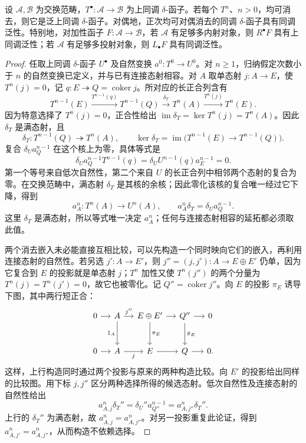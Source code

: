 \begin{theorem}[消去性与泛性]\label{b4:thm:derived-universal}
	设 \(\mathcal A,\mathcal B\) 为交换范畴，\(T^\bullet:\mathcal A\to\mathcal B\) 为上同调 \(\delta\)-函子。若每个 \(T^n\)、\(n>0\)，均可消去，则它是泛上同调 \(\delta\)-函子。对偶地，正次均可对偶消去的同调 \(\delta\)-函子具有同调泛性。特别地，对加性函子 \(F:\mathcal A\to\mathcal B\)，若 \(\mathcal A\) 有足够多内射对象，则 \(R^\bullet F\) 具有上同调泛性；若 \(\mathcal A\) 有足够多投射对象，则 \(L_\bullet F\) 具有同调泛性。
\end{theorem}
\begin{proof}
	任取上同调 \(\delta\)-函子 \(U^\bullet\) 及自然变换 \(a^0:T^0\to U^0\)。对 \(n\ge1\)，归纳假定次数小于 \(n\) 的自然变换已定义，并与已有连接态射相容。对 \(A\) 取单态射 \(j:A\to E\)，使 \(T^n(j)=0\)，记 \(q:E\twoheadrightarrow Q=\operatorname{coker}j\)。所对应的长正合列含有
	\[
		T^{n-1}(E)\xrightarrow{T^{n-1}(q)}T^{n-1}(Q) \xrightarrow{\delta_T}T^n(A)\xrightarrow{T^n(j)}T^n(E).
	\]
	因为特意选择了 \(T^n(j)=0\)，正合性给出 \(\operatorname{im}\delta_T=\ker T^n(j)=T^n(A)\)。因此 \(\delta_T\) 是满态射，且
	\[
		\delta_T:T^{n-1}(Q)\twoheadrightarrow T^n(A), \qquad \ker\delta_T=\operatorname{im}\bigl(T^{n-1}(E)\to T^{n-1}(Q)\bigr).
	\]
	复合 \(\delta_Ua_Q^{n-1}\) 在这个核上为零，具体等式是
	\[
		\delta_Ua_Q^{n-1}T^{n-1}(q) =\delta_UU^{n-1}(q)a_E^{n-1}=0.
	\]
	第一个等号来自低次自然性，第二个来自 \(U\) 的长正合列中相邻两个态射的复合为零。在交换范畴中，满态射 \(\delta_T\) 是其核的余核；因此零化该核的复合唯一经过它下降，得到
	\[
		a_A^n:T^n(A)\longrightarrow U^n(A), \qquad a_A^n\delta_T=\delta_Ua_Q^{n-1}.
	\]
	这里 \(\delta_T\) 是满态射，所以等式唯一决定 \(a_A^n\)；任何与连接态射相容的延拓都必须取此值。

	两个消去嵌入未必能直接互相比较，可以先构造一个同时映向它们的嵌入，再利用连接态射的自然性。若另选 \(j':A\to E'\)，则 \(j''=(j,j'):A\to E\oplus E'\) 仍单，因为它复合到 \(E\) 的投影就是单态射 \(j\)；\(T^n\) 加性又使 \(T^n(j'')\) 的两个分量为 \(T^n(j)=T^n(j')=0\)，故它也被零化。记 \(Q''=\operatorname{coker}j''\)。向 \(E\) 的投影 \(\pi_E\) 诱导下图，其中两行短正合：
	\[
		\begin{tikzcd}[column sep=small,row sep=large]
			0\arrow[r]&A\arrow[r,"j''"]\arrow[d,"1_A"'] &E\oplus E'\arrow[r]\arrow[d,"\pi_E"] &Q''\arrow[r]\arrow[d,"\bar\pi_E"]&0\\
			0\arrow[r]&A\arrow[r,"j"']&E\arrow[r]&Q\arrow[r]&0.
		\end{tikzcd}
	\]
	这样，上行构造同时通过两个投影与原来的两种构造比较。向 \(E'\) 的投影给出同样的比较图。用下标 \(j,j''\) 区分两种选择所得的候选态射。低次自然性及连接态射的自然性给出
	\[
		a_{A,j}^n\delta_T''=\delta_U''a_{Q''}^{n-1} =a_{A,j''}^n\delta_T''.
	\]
	上行的 \(\delta_T''\) 为满态射，故 \(a_{A,j}^n=a_{A,j''}^n\)。对另一投影重复此论证，得到 \(a_{A,j'}^n=a_{A,j''}^n\)，从而构造不依赖选择。


\end{proof}

